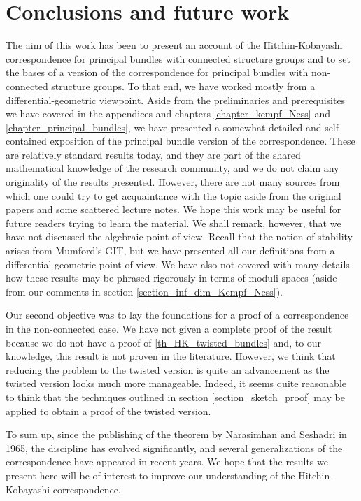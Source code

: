 \section{Conclusions and future work} 
The aim of this work has been to present an account of the Hitchin-Kobayashi correspondence for principal bundles with connected structure groups and to set the bases of a version of the correspondence for principal bundles with non-connected structure groups. To that end, we have worked mostly from a differential-geometric viewpoint. Aside from the preliminaries and prerequisites we have covered in the appendices and chapters \ref{chapter_kempf_Ness} and \ref{chapter_principal_bundles}, we have presented a somewhat detailed and self-contained exposition of the principal bundle version of the correspondence. These are relatively standard results today, and they are part of the shared mathematical knowledge of the research community, and we do not claim any originality of the results presented. However, there are not many sources from which one could try to get acquaintance with the topic aside from the original papers and some scattered lecture notes. We hope this work may be useful for future readers trying to learn the material. We shall remark, however, that we have not discussed the algebraic point of view. Recall that the notion of stability arises from Mumford's GIT, but we have presented all our definitions from a differential-geometric point of view. We have also not covered with many details how these results may be phrased rigorously in terms of moduli spaces (aside from our comments in section \ref{section_inf_dim_Kempf_Ness}). 

Our second objective was to lay the foundations for a proof of a correspondence in the non-connected case. We have not given a complete proof of the result because we do not have a proof of \ref{th_HK_twisted_bundles} and, to our knowledge, this result is not proven in the literature. However, we think that reducing the problem to the twisted version is quite an advancement as the twisted version looks much more manageable. Indeed, it seems quite reasonable to think that the techniques outlined in section \ref{section_sketch_proof} may be applied to obtain a proof of the twisted version. 

To sum up, since the publishing of the theorem by Narasimhan and Seshadri in 1965, the discipline has evolved significantly, and several generalizations of the correspondence have appeared in recent years. We hope that the results we present here will be of interest to improve our understanding of the Hitchin-Kobayashi correspondence.

